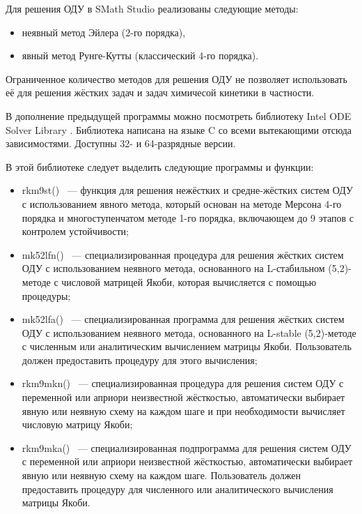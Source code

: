 Для решения ОДУ в SMath Studio реализованы следующие методы:

\begin{itemize}
    \item неявный метод Эйлера (2-го порядка),
    \item явный метод Рунге-Кутты (классический 4-го порядка).
\end{itemize}

Ограниченное количество методов для решения ОДУ не позволяет использовать её для решения жёстких задач и задач химичесой кинетики
в частности.

В дополнение предыдущей программы можно посмотреть библиотеку Intel ODE Solver Library \cite{Wikipedia7}.
Библиотека написана на языке C со всеми вытекающими отсюда зависимостями. Доступны 32- и 64-разрядные версии.

В этой библиотеке следует выделить следующие программы и функции:

\begin{itemize}
    \item rkm9st() ~--- функция для решения нежёстких и средне-жёстких систем ОДУ с использованием явного метода, который основан на
        методе Мерсона 4-го порядка и многоступенчатом методе 1-го порядка, включающем до 9 этапов с контролем устойчивости;
    \item mk52lfn() ~--- специализированная процедура для решения жёстких систем ОДУ с использованием неявного метода, основанного
        на L-стабильном (5,2)-методе с числовой матрицей Якоби, которая вычисляется с помощью процедуры;
    \item mk52lfa() ~--- специализированная программа для решения жёстких систем ОДУ с использованием неявного метода, основанного на
        L-stable (5,2)-методе с численным или аналитическим вычислением матрицы Якоби. Пользователь должен предоставить процедуру для
        этого вычисления;
    \item rkm9mkn() ~--- специализированная процедура для решения систем ОДУ с переменной или априори неизвестной жёсткостью,
        автоматически выбирает явную или неявную схему на каждом шаге и при необходимости вычисляет числовую матрицу Якоби;
    \item rkm9mka() ~--- специализированная подпрограмма для решения систем ОДУ с переменной или априори неизвестной жёсткостью,
        автоматически выбирает явную или неявную схему на каждом шаге. Пользователь должен предоставить процедуру для численного или
        аналитического вычисления матрицы Якоби.
\end{itemize}


